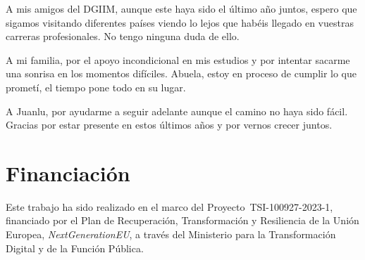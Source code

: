A mis amigos del DGIIM, aunque este haya sido el último año juntos, espero que sigamos visitando diferentes países viendo lo lejos que habéis llegado en vuestras carreras profesionales. No tengo ninguna duda de ello. 

A mi familia, por el apoyo incondicional en mis estudios y por intentar sacarme una sonrisa en los momentos difíciles. Abuela, estoy en proceso de cumplir lo que prometí, el tiempo pone todo en su lugar. 

A Juanlu, por ayudarme a seguir adelante aunque el camino no haya sido fácil. Gracias por estar presente en estos últimos años y por vernos crecer juntos. 



\chapter*{Financiación}
\thispagestyle{empty}

       \vspace{1cm}

Este trabajo ha sido realizado en el marco del Proyecto~\mbox{TSI-100927-2023-1}, financiado por el Plan de Recuperación, Transformación y Resiliencia de la Unión Europea, \textit{NextGenerationEU}, a través del Ministerio para la Transformación Digital y de la Función Pública.

